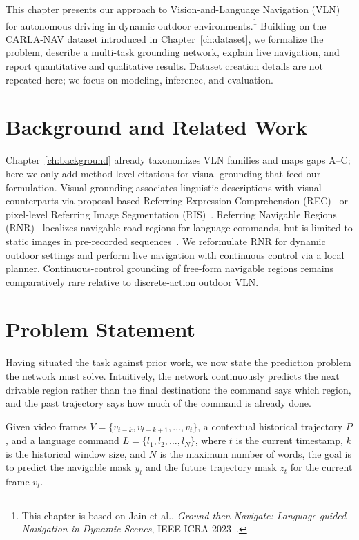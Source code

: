 This chapter presents our approach to Vision-and-Language Navigation (VLN) for autonomous driving in dynamic outdoor environments.\footnote{This chapter is based on Jain et al., \textit{Ground then Navigate: Language-guided Navigation in Dynamic Scenes}, IEEE ICRA 2023~\cite{jain2023ground}.} Building on the CARLA-NAV dataset introduced in Chapter~\ref{ch:dataset}, we formalize the problem, describe a multi-task grounding network, explain live navigation, and report quantitative and qualitative results. Dataset creation details are not repeated here; we focus on modeling, inference, and evaluation.

\section{Background and Related Work}

Chapter~\ref{ch:background} already taxonomizes VLN families and maps gaps A--C; here we only add method-level citations for visual grounding that feed our formulation. Visual grounding associates linguistic descriptions with visual counterparts via proposal-based Referring Expression Comprehension (REC)~\cite{rohrbach2016grounding,hu2016natural,plummer2018conditional,rufus2020cosine,deng2018visual,zhang2018grounding,yang2019dynamic,qiu2020language} or pixel-level Referring Image Segmentation (RIS)~\cite{shi2018key,ye2019cross,huang2020referring,jain2021comprehensive}. Referring Navigable Regions (RNR)~\cite{Rufus_2021} localizes navigable road regions for language commands, but is limited to static images in pre-recorded sequences~\cite{caesar2020nuscenes}. We reformulate RNR for dynamic outdoor settings and perform live navigation with continuous control via a local planner. Continuous-control grounding of free-form navigable regions remains comparatively rare relative to discrete-action outdoor VLN.

\section{Problem Statement}

Having situated the task against prior work, we now state the prediction problem the network must solve. Intuitively, the network continuously predicts the next drivable region rather than the final destination: the command says which region, and the past trajectory says how much of the command is already done.

Given video frames $V=\{v_{t-k}, v_{t-k+1}, \ldots, v_{t}\}$, a contextual historical trajectory $P$, and a language command $L = \{l_1, l_2, \ldots, l_N\}$, where $t$ is the current timestamp, $k$ is the historical window size, and $N$ is the maximum number of words, the goal is to predict the navigable mask $y_t$ and the future trajectory mask $z_t$ for the current frame $v_t$.

